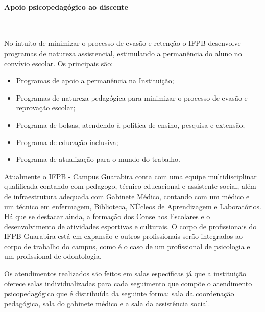 \paragraph{Apoio psicopedagógico ao discente}\

       No intuito de minimizar o processo de evasão e retenção o IFPB desenvolve programas de natureza assistencial, estimulando a permanência do aluno no convívio escolar. Os principais são: 


\begin{itemize}
\item Programas de apoio a permanência na Instituição;

\item Programas de natureza pedagógica para minimizar o processo de evasão e reprovação escolar;

\item Programa de bolsas, atendendo à política de ensino, pesquisa e extensão;

\item Programa de educação inclusiva;

\item Programa de atualização para o mundo do trabalho.
\end{itemize}

      Atualmente o IFPB - Campus Guarabira conta com uma equipe multidisciplinar qualificada contando com pedagogo, técnico educacional e assistente social, além de infraestrutura adequada com Gabinete Médico, contando com um m\'edico e um t\'ecnico em enfermagem, Biblioteca, NÚcleos de Aprendizagem e Laboratórios. Há que se destacar ainda, a formação dos Conselhos Escolares e o desenvolvimento de atividades esportivas e culturais. O corpo de profissionais do IFPB Guarabira est\'a em expans\~ao e outros profissionais ser\~ao integrados ao corpo de trabalho do campus, como \'e o caso de um profissional de psicologia e um profissional de odontologia.


       Os atendimentos realizados são feitos em salas específicas já que a instituição oferece salas individualizadas para cada seguimento que compõe o atendimento psicopedagógico que é distribuída da seguinte forma: sala da coordenação pedagógica, sala do gabinete médico e a sala da assistência social. 


